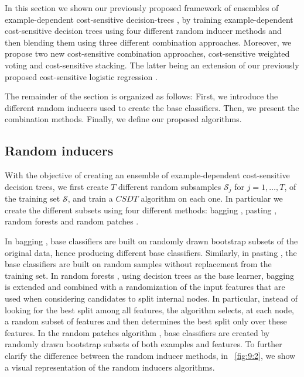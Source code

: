 {In this section we shown our previously proposed framework of ensembles of  example-dependent 
cost-sensitive  decision-trees \citep{CorreaBahnsen2015b}, by training example-dependent 
cost-sensitive decision trees using four different  random inducer methods and then blending them 
using three different combination approaches. Moreover, we propose two new cost-sensitive 
combination approaches, cost-sensitive weighted  voting and cost-sensitive stacking. The latter 
being an extension of our previously proposed cost-sensitive logistic regression 
\citep{CorreaBahnsen2014b}. 

The remainder of the section is organized as follows: First, we introduce the different random 
inducers used to create the base classifiers. Then, we present the combination methods. Finally, we 
define our proposed algorithms.


\subsection{Random inducers}

With the objective of creating an ensemble of example-dependent cost-sensitive decision trees, we 
first create $T$ different random subsamples $\mathcal{S}_j$ for $j=1,\dots,T$, of the training  
set 
$\mathcal{S}$, and train a $CSDT$ algorithm on each one. In particular we create the different 
subsets using four different methods: bagging \citep{Breiman1996}, pasting \citep{Breiman1999}, 
random forests \citep{Breiman2001} and random patches \citep{Louppe2012}. 

In bagging \citep{Breiman1996}, base classifiers are built on randomly drawn bootstrap subsets of 
the original data, hence producing different base classifiers. Similarly, in pasting 
\citep{Breiman1999}, the base classifiers are built on random  samples without replacement from 
the training set. In random forests \citep{Breiman2001}, using decision trees as the base learner, 
bagging   is extended and   combined  with a  randomization of the input features that  are used 
when  considering candidates  to split    internal nodes. In particular, instead of looking for  
the best  split among all   features, the   algorithm selects, at each node, a random subset of 
features  and then determines   the best split only over  these features. In the random patches   
algorithm \citep{Louppe2012}, base classifiers are created by randomly     drawn bootstrap subsets 
of both examples and features. To further clarify the difference between the random inducer 
methods, in \figurename{~\ref{fig:9:2}}, we show a visual representation of the random inducers 
algorithms.
 
}
